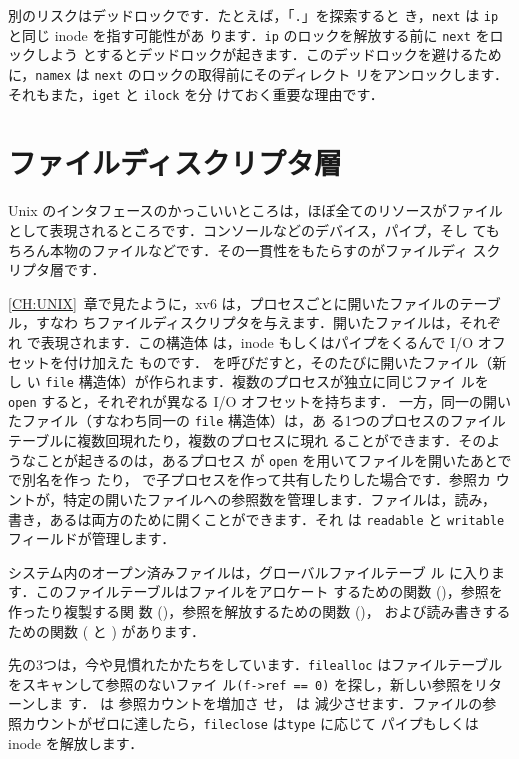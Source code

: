 別のリスクはデッドロックです．たとえば，「\texttt{.}」を探索すると
き，\texttt{next} は \texttt{ip} と同じ inode を指す可能性があ
ります．\texttt{ip} のロックを解放する前に \texttt{next} をロックしよう
とするとデッドロックが起きます．このデッドロックを避けるため
に，\texttt{namex} は \texttt{next} のロックの取得前にそのディレクト
リをアンロックします．それもまた，\texttt{iget} と \texttt{ilock} を分
けておく重要な理由です．

\section{ファイルディスクリプタ層}

Unix のインタフェースのかっこいいところは，ほぼ全てのリソースがファイル
として表現されるところです．コンソールなどのデバイス，パイプ，そし
てもちろん本物のファイルなどです．その一貫性をもたらすのがファイルディ
スクリプタ層です．

\ref{CH:UNIX}~章で見たように，xv6 は，プロセスごとに開いたファイルのテーブル，すなわ
ちファイルディスクリプタを与えます．開いたファイルは，それぞ
れ   で表現されます．この構造体
は，inode もしくはパイプをくるんで I/O オフセットを付け加えた
ものです． を呼びだすと，そのたびに開いたファイル（新し
い \texttt{file} 構造体）が作られます．複数のプロセスが独立に同じファイ
ルを \texttt{open} すると，それぞれが異なる I/O オフセットを持ちます．
一方，同一の開いたファイル（すなわち同一の \texttt{file} 構造体）は，あ
る1つのプロセスのファイルテーブルに複数回現れたり，複数のプロセスに現れ
ることができます．そのようなことが起きるのは，あるプロセス
が \texttt{open} を用いてファイルを開いたあとで で別名を作っ
たり， で子プロセスを作って共有したりした場合です．参照カ
ウントが，特定の開いたファイルへの参照数を管理します．ファイルは，読み，
書き，あるは両方のために開くことができます．それ
は \texttt{readable} と \texttt{writable} フィールドが管理します．

システム内のオープン済みファイルは，グローバルファイルテーブ
ル に入ります．このファイルテーブルはファイルをアロケート
するための関数 ()，参照を作ったり複製する関
数 ()，参照を解放するための関数 ()，
および読み書きするための関数 ( と )
があります．

先の3つは，今や見慣れたかたちをしています．\texttt{filealloc}
 はファイルテーブルをスキャンして参照のないファイ
ル\texttt{(f->ref == 0)} を探し，新しい参照をリターンしま
す．  は
参照カウントを増加さ
せ，  は
減少させます．ファイルの参
照カウントがゼロに達したら，\texttt{fileclose} は\texttt{type} に応じて
パイプもしくは inode を解放します．

